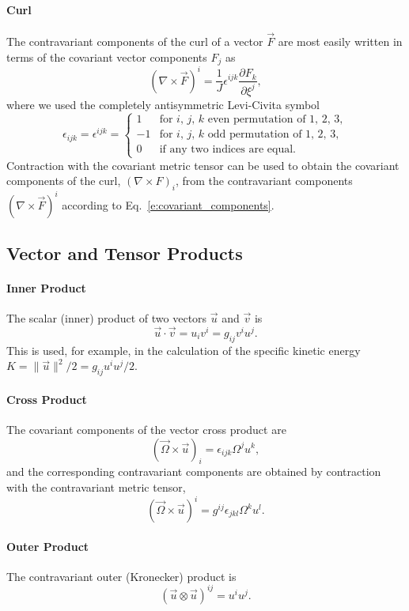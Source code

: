 \documentclass{report}
\begin{document}
\paragraph{Curl} The contravariant components of the curl of a vector $\vec{F}$ are most easily written in terms of the covariant vector components $F_j$ as
\[
(\nabla \times \vec{F})^i = \frac{1}{J} \epsilon^{ijk} \frac{\partial F_k}{\partial \xi^j},
\]
where we used the completely antisymmetric Levi-Civita symbol 
\[
\epsilon_{ijk} = \epsilon^{ijk} = 
\begin{cases}
1 & \text{for $i$, $j$, $k$ even permutation of 1, 2, 3},\\
-1 & \text{for $i$, $j$, $k$ odd permutation of 1, 2, 3},\\
0 & \text{if any two indices are equal}.
\end{cases}
\]
Contraction with the covariant metric tensor can be used to obtain the covariant components of the curl, $(\nabla \times F)_i$, from the contravariant components $(\nabla \times \vec{F})^i$ according to  Eq.~\eqref{e:covariant_components}.

\subsection{Vector and Tensor Products}

\paragraph{Inner Product} The scalar (inner) product of two vectors $\vec{u}$ and $\vec{v}$ is 
\[
\vec{u} \cdot \vec{v} = u_i v^i = g_{ij} v^i u^j.
\]
This is used, for example, in the calculation of the specific kinetic energy $K = \| \vec{u} \|^2/2 = g_{ij} u^i u^j/2$.

\paragraph{Cross Product}
The covariant components of the vector cross product are
\[
(\vec{\Omega} \times \vec{u})_i = \epsilon_{ijk} \Omega^j u^k,
\]
and the corresponding contravariant components are obtained by contraction with the contravariant metric tensor,
\[
(\vec{\Omega} \times \vec{u})^i = g^{ij} \epsilon_{jkl} \Omega^k u^l.
\]

\paragraph{Outer Product} The contravariant outer (Kronecker) product is 
\[
(\vec{u} \otimes \vec{u})^{ij} = u^i u^j.
\]
\end{document}
